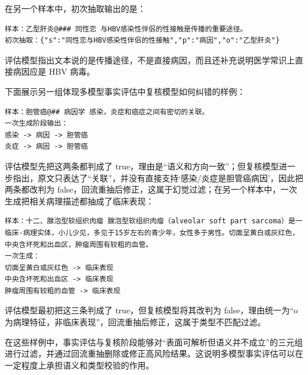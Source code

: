 在另一个样本中，初次抽取输出的是：
\begin{lstlisting}[style=promptbox]
样本：乙型肝炎@### 同性恋 与HBV感染性伴侣的性接触是传播的重要途径。
初次抽取：{"s":"同性恋与HBV感染性伴侣的性接触","p":"病因","o":"乙型肝炎"}
\end{lstlisting}
评估模型指出文本说的是传播途径，不是直接病因，而且还补充说明医学常识上直接病因应是 HBV 病毒。

下面展示另一组体现多模型事实评估中复核模型如何纠错的样例：

\begin{lstlisting}[style=promptbox]
样本：胆管癌@## 病因学 感染，炎症和癌症之间有密切的关联。
一次生成阶段输出：
感染 -> 病因 -> 胆管癌
炎症 -> 病因 -> 胆管癌
\end{lstlisting}
评估模型先把这两条都判成了 true，理由是“语义和方向一致”；但复核模型进一步指出，原文只表达了“关联”，并没有直接支持‘感染/炎症是胆管癌病因’，因此把两条都改判为 false，回流重抽后修正，这属于幻觉过滤；在另一个样本中，一次生成把相关病理描述都抽成了临床表现：

\begin{lstlisting}[style= promptbox]
样本：十二、腺泡型软组织肉瘤 腺泡型软组织肉瘤（alveolar soft part sarcoma）是一临床-病理实体，小儿少见，多见于15岁左右的青少年，女性多于男性。切面呈黄白或灰红色，中央含坏死和出血区，肿瘤周围有较粗的血管。
一次生成：
切面呈黄白或灰红色 -> 临床表现
中央含坏死和出血区 -> 临床表现
肿瘤周围有较粗的血管 -> 临床表现
\end{lstlisting}
评估模型最初把这三条判成了 true，但复核模型将其改判为 false，理由统一为“o为病理特征，非临床表现”，回流重抽后修正，这属于类型不匹配过滤。

在这些样例中，事实评估与复核阶段能够对“表面可解析但语义并不成立”的三元组进行过滤，并通过回流重抽删除或修正高风险结果。这说明多模型事实评估可以在一定程度上承担语义和类型校验的作用。

